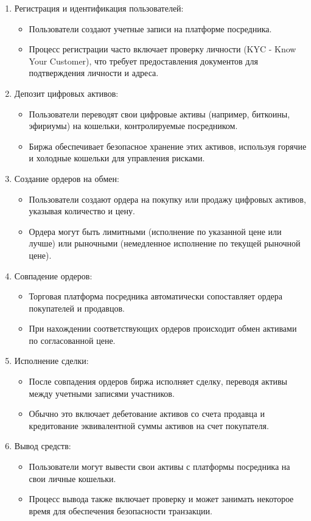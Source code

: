 \begin{enumerate}
\item Регистрация и идентификация пользователей:
	\begin{itemize}
	\item Пользователи создают учетные записи на платформе посредника.
	\item Процесс регистрации часто включает проверку личности (KYC - Know Your Customer), что требует предоставления документов для подтверждения личности и адреса.
	\end{itemize}
\item Депозит цифровых активов:
	\begin{itemize}
	\item Пользователи переводят свои цифровые активы (например, биткоины, эфириумы) на кошельки, контролируемые посредником.
	\item Биржа обеспечивает безопасное хранение этих активов, используя горячие и холодные кошельки для управления рисками.
	\end{itemize}
\item Создание ордеров на обмен:
	\begin{itemize}
	\item Пользователи создают ордера на покупку или продажу цифровых активов, указывая количество и цену.
	\item Ордера могут быть лимитными (исполнение по указанной цене или лучше) или рыночными (немедленное исполнение по текущей рыночной цене).
	\end{itemize}
\item Совпадение ордеров:
	\begin{itemize}
	\item Торговая платформа посредника автоматически сопоставляет ордера покупателей и продавцов.
	\item При нахождении соответствующих ордеров происходит обмен активами по согласованной цене.
	\end{itemize}
\item Исполнение сделки:
	\begin{itemize}
	\item После совпадения ордеров биржа исполняет сделку, переводя активы между учетными записями участников.
	\item Обычно это включает дебетование активов со счета продавца и кредитование эквивалентной суммы активов на счет покупателя.
	\end{itemize}
\item Вывод средств:
	\begin{itemize}
	\item Пользователи могут вывести свои активы с платформы посредника на свои личные кошельки.
	\item Процесс вывода также включает проверку и может занимать некоторое время для обеспечения безопасности транзакции.
	\end{itemize}
\end{enumerate}

